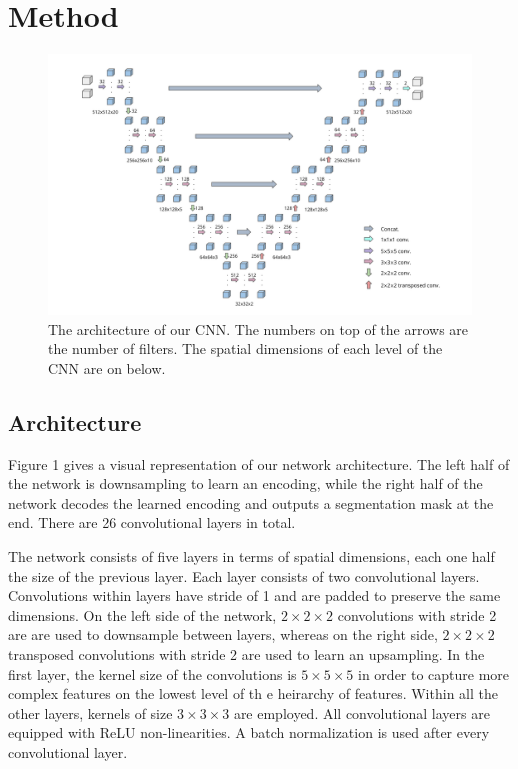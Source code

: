 \documentclass[11pt]{article}
\begin{document}
\section{Method}
\begin{figure}
\includegraphics[width=\textwidth]{figures/fig2.png}
\caption{The architecture of our CNN. The numbers on top of the arrows are the number of filters. The spatial dimensions of each level of the CNN are on below.}
\end{figure}

\subsection{Architecture}
Figure 1 gives a visual representation of our network architecture. The left half of the network is downsampling to learn an encoding, while the right half of the network decodes the learned encoding and outputs a segmentation mask at the end. There are 26 convolutional layers in total.

The network consists of five layers in terms of spatial dimensions, each one half the size of the previous layer. Each layer consists of two convolutional layers. Convolutions within layers have stride of 1 and are padded to preserve the same dimensions. On the left side of the network, $2 \times 2 \times 2$ convolutions with stride 2 are are used to downsample between layers, whereas on the right side, $2 \times 2 \times 2$ transposed convolutions with stride 2 are used to learn an upsampling. In the first layer, the kernel size of the convolutions is $5 \times 5 \times 5$ in order to capture more complex features on the lowest level of th e heirarchy of features. Within all the other layers, kernels of size $3 \times 3 \times 3$ are employed. All convolutional layers are equipped with ReLU non-linearities. A batch normalization is used after every convolutional layer.
\end{document}

